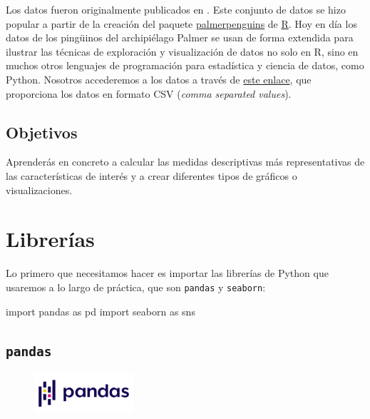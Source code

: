 \documentclass[
  a4paper,
  noprof,
  12pt,
  notoc,
  nosols,
  nobib]{mnye}
\newenvironment{Shaded}{\begin{snugshade}}{\end{snugshade}}
\newcommand{\ImportTok}[1]{\textcolor[rgb]{0.00,0.46,0.62}{#1}}
\newcommand{\NormalTok}[1]{\textcolor[rgb]{0.00,0.23,0.31}{#1}}
\theoremstyle{definition}
\theoremstyle{remark}
\begin{document}
Los datos fueron originalmente publicados en \textcite{Gorman2014}. Este
conjunto de datos se hizo popular a partir de la creación del paquete
\href{https://github.com/allisonhorst/palmerpenguins}{palmerpenguins} de
\href{https://www.r-project.org/}{R}. Hoy en día los datos de los
pingüinos del archipiélago Palmer se usan de forma extendida para
ilustrar las técnicas de exploración y visualización de datos no solo en
R, sino en muchos otros lenguajes de programación para estadística y
ciencia de datos, como Python. Nosotros accederemos a los datos a través
de
\href{https://github.com/mwaskom/seaborn-data/blob/master/penguins.csv}{este
enlace}, que proporciona los datos en formato CSV (\emph{comma separated
values}).

\hypertarget{objetivos}{%
\subsection*{Objetivos}\label{objetivos}}


Aprenderás en concreto a calcular las medidas descriptivas más
representativas de las características de interés y a crear diferentes
tipos de gráficos o visualizaciones.


\hypertarget{libreruxedas}{%
\section{Librerías}\label{libreruxedas}}

Lo primero que necesitamos hacer es importar las librerías de Python que
usaremos a lo largo de práctica, que son \texttt{pandas} y
\texttt{seaborn}:

\begin{Shaded}
\begin{Highlighting}[]
\ImportTok{import}\NormalTok{ pandas }\ImportTok{as}\NormalTok{ pd}
\ImportTok{import}\NormalTok{ seaborn }\ImportTok{as}\NormalTok{ sns}
\end{Highlighting}
\end{Shaded}

\hypertarget{pandas}{%
\subsection{\texorpdfstring{\texttt{pandas}}{pandas}}\label{pandas}}

\begin{figure}[tbph]

{\centering \includegraphics[width=\textwidth,height=4em]{chapters/../img/pandas.png}

}

\end{figure}
\end{document}
